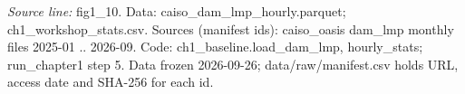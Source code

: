 {\scriptsize\textit{Source line:} fig1\_\allowbreak{}10. Data: caiso\_\allowbreak{}dam\_\allowbreak{}lmp\_\allowbreak{}hourly.parquet; ch1\_\allowbreak{}workshop\_\allowbreak{}stats.csv. Sources (manifest ids): caiso\_\allowbreak{}oasis dam\_\allowbreak{}lmp monthly files 2025-01 .. 2026-09. Code: ch1\_\allowbreak{}baseline.load\_\allowbreak{}dam\_\allowbreak{}lmp, hourly\_\allowbreak{}stats; run\_\allowbreak{}chapter1 step 5. Data frozen 2026-09-26; data/raw/manifest.csv holds URL, access date and SHA-256 for each id.}